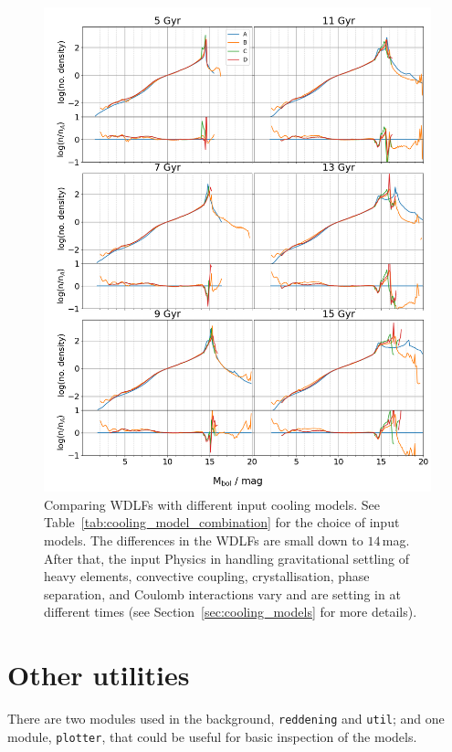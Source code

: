 \documentclass[fleqn,usenatbib]{rasti}
\begin{document}
\begin{figure}
    \centering
    \includegraphics[width=\textwidth]{fig_12_wdlf_compare_da_cooling_models.png}
    \caption{Comparing WDLFs with different input cooling models. See
    Table~\ref{tab:cooling_model_combination} for the choice of input models.
    The differences in the WDLFs are small down to $14$\,mag. After that, the
    input Physics in handling gravitational settling of heavy elements,
    convective coupling, crystallisation, phase separation, and Coulomb
    interactions vary and are setting in at different times (see
    Section~\ref{sec:cooling_models} for more details).
    }
    \label{fig:wdlf_compare_da_cooling_models}
\end{figure}


\section{Other utilities}
\label{sec:utility}
There are two modules used in the background, \texttt{reddening} and
\texttt{util}; and one module, \texttt{plotter}, that could be useful for
basic inspection of the models. 
\end{document}
